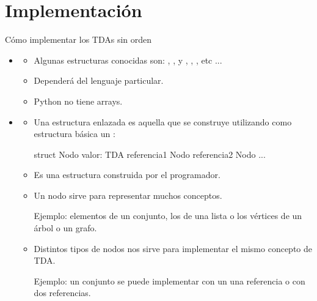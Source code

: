 \documentclass[10pt,envcountsect,spanish]{beamer}
\begin{document}
\section{Implementación}


\begin{frame}[fragile]{Cómo implementar los TDAs sin orden}

\begin{itemize}

\item {}

\begin{itemize}
\item Algunas estructuras conocidas son: ,  ,  y , , , etc ...

\item Dependerá del lenguaje particular.


\item Python no tiene arrays.
\end{itemize}



\item {} 

\begin{itemize}
\item Una estructura enlazada es aquella que se construye utilizando como estructura básica un : 

\begin{pyverbatim}
struct Nodo
   valor: TDA
   referencia1 Nodo
   referencia2 Nodo
   ...
\end{pyverbatim}

\item Es una estructura construida por el programador.

\item Un nodo  sirve para representar muchos conceptos.

Ejemplo: elementos de un conjunto, los de una lista o los vértices de un árbol o un grafo.  

\item Distintos tipos de nodos nos sirve para implementar el mismo concepto de TDA. 

Ejemplo: un conjunto se puede implementar con un una referencia o con dos referencias.
\end{itemize}

\end{itemize}

\end{frame}
\end{document}
